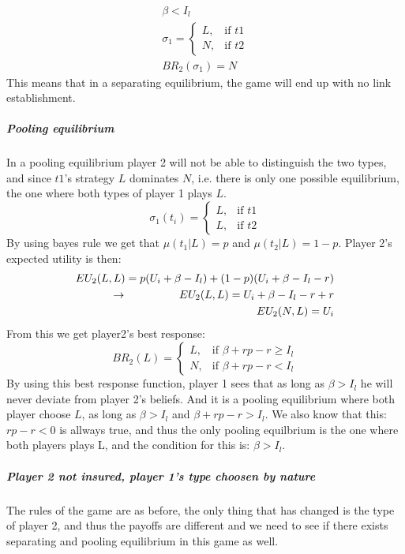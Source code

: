 \begin{eqnarray}
\beta<I_{l}\\
 \sigma_{1}= 
\begin{cases}
   L,& \text{if } t1\\
   N,& \text{if } t2  
\end{cases}\\
BR_{2}(\sigma_{1})=N
\end{eqnarray} 
This means that in a separating equilibrium, the game will end up with no link establishment.
\subparagraph{Pooling equilibrium}
In a pooling equilibrium player 2 will not be able to distinguish the two types, and since $t1$'s strategy $L$ dominates $N$, i.e. there is only one possible equilibrium, the one where both types of player 1 plays $L$.
\begin{equation}
    \sigma_{1}(t_{i})= 
\begin{cases}
   L,& \text{if } t1\\
   L,& \text{if } t2  
\end{cases}
\label{eq:player2beliefpooling}
\end{equation}
By using bayes rule we get that $\mu(t_{1}|L)=p$ and $\mu(t_{2}|L)=1-p$.
Player 2's expected utility is then:
\begin{eqnarray}
EU_{2}(L,L)=p(U_{i}+\beta-I_{l})+(1-p)(U_{i}+\beta-I_{l}-r)\nonumber\\
\llap{$\rightarrow$\hspace{50pt}}EU_{2}(L,L)=U_{i}+\beta-I_{l}-r+r\\
EU_{2}(N,L)=U_{i}
\end{eqnarray}
From this we get player2's best response:
\begin{equation}
BR_{2}(L)=
\begin{cases}
L ,& \text{if } \beta + rp-r\geq I_{l} \\
N ,& \text{if } \beta +rp -r < I_{l} 
\end{cases}
\end{equation}
By using this best response function, player 1 sees that as long as $\beta>I_{l}$ he will never deviate from player 2's beliefs. And it is a pooling equilibrium where both player choose $L$, as long as $\beta>I_{l}$ and $\beta +rp-r>I_{l}$.
We also know that this: $rp-r<0$ is allways true, and thus the only pooling equilbrium is the one where both players plays L, and the condition for this is: $\beta>I_{l}$.
\subparagraph{Player 2 not insured, player 1's type choosen by nature}
The rules of the game are as before, the only thing that has changed is the type of player 2, and thus the payoffs are different and we need to see if there exists separating and pooling equilibrium in this game as well.
